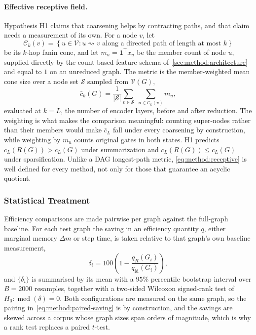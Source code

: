\paragraph{Effective receptive field.}
Hypothesis H1 claims that coarsening helps by contracting paths, and that claim needs a
measurement of its own. For a node $v$, let
\begin{equation}
    \mathcal{C}_k(v) = \left\{ u \in \mathcal{V} : u \rightsquigarrow v
        \text{ along a directed path of length at most } k \right\}
    \label{eq:method:cone}
\end{equation}
be its $k$-hop fanin cone, and let $m_u = \mathbf{1}^{\top} x_u$ be the member count of
node $u$, supplied directly by the count-based feature schema
of~\ref{sec:method:architecture} and equal to $1$ on an unreduced graph. The metric is the
member-weighted mean cone size over a node set $\mathcal{S}$ sampled from $\mathcal{V}(G)$,
\begin{equation}
    \bar{c}_k(G) = \frac{1}{\left| \mathcal{S} \right|} \sum_{v \in \mathcal{S}}
        \; \sum_{u \in \mathcal{C}_k(v)} m_u,
    \label{eq:method:receptive}
\end{equation}
evaluated at $k = L$, the number of encoder layers, before and after reduction. The
weighting is what makes the comparison meaningful: counting super-nodes rather than their
members would make $\bar{c}_L$ fall under every coarsening by construction, while weighting
by $m_u$ counts original gates in both states. H1 predicts
$\bar{c}_L(R(G)) > \bar{c}_L(G)$ under summarization and
$\bar{c}_L(R(G)) \leq \bar{c}_L(G)$ under sparsification. Unlike a DAG longest-path metric,
\eqref{eq:method:receptive} is well defined for every method, not only for those that
guarantee an acyclic quotient.

\subsubsection{Statistical Treatment}
\label{sec:method:experiment:metrics:stats}
Efficiency comparisons are made pairwise per graph against the full-graph baseline. For
each test graph the saving in an efficiency quantity $q$, either marginal memory $\Delta m$
or step time, is taken relative to that graph's own baseline measurement,
\begin{equation}
    \delta_i = 100 \left( 1 - \frac{q_R(G_i)}{q_{\operatorname{id}}(G_i)} \right),
    \label{eq:method:paired-saving}
\end{equation}
and $\{\delta_i\}$ is summarised by its mean with a $95\%$ percentile bootstrap interval
over $B = 2000$ resamples, together with a two-sided Wilcoxon signed-rank test of
$H_0 \colon \operatorname{med}(\delta) = 0$. Both configurations are measured on the same
graph, so the pairing in~\eqref{eq:method:paired-saving} is by construction, and the
savings are skewed across a corpus whose graph sizes span orders of magnitude, which is why
a rank test replaces a paired $t$-test.

